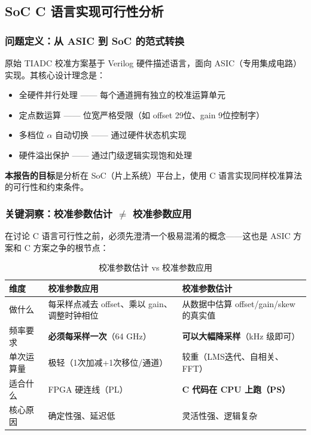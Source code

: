 \documentclass[UTF8,a4paper,11pt]{ctexart}
\begin{document}
\subsection{SoC C 语言实现可行性分析}
\label{sec:soc_feasibility}

\subsubsection{问题定义：从 ASIC 到 SoC 的范式转换}

原始 TIADC 校准方案基于 Verilog 硬件描述语言，面向 ASIC（专用集成电路）实现。其核心设计理念是：
\begin{itemize}
    \item 全硬件并行处理 —— 每个通道拥有独立的校准运算单元
    \item 定点数运算 —— 位宽严格受限（如 offset 29位、gain 9位控制字）
    \item 多档位 $\alpha$ 自动切换 —— 通过硬件状态机实现
    \item 硬件溢出保护 —— 通过门级逻辑实现饱和处理
\end{itemize}

\textbf{本报告的目标}是分析在 SoC（片上系统）平台上，使用 C 语言实现同样校准算法的可行性和约束条件。

\subsubsection{关键洞察：校准参数估计 $\neq$ 校准参数应用}

在讨论 C 语言可行性之前，必须先澄清一个极易混淆的概念——这也是 ASIC 方案和 C 方案之争的根节点：

\begin{table}[ht]
\centering
\caption{校准参数估计 vs 校准参数应用}
\begin{tabular}{p{2.8cm}p{4.5cm}p{4.5cm}}
\toprule
\textbf{维度} & \textbf{校准参数应用} & \textbf{校准参数估计} \\
\midrule
做什么 & 每采样点减去 offset、乘以 gain、调整时钟相位 & 从数据中估算 offset/gain/skew 的真实值 \\
频率要求 & \textbf{必须每采样一次}（64 GHz） & \textbf{可以大幅降采样}（kHz 级即可） \\
单次运算量 & 极轻（1次加减+1次移位/通道） & 较重（LMS迭代、自相关、FFT） \\
适合什么 & FPGA 硬连线（PL） & \textbf{C 代码在 CPU 上跑（PS）} \\
核心原因 & 确定性强、延迟低 & 灵活性强、逻辑复杂 \\
\bottomrule
\end{tabular}
\end{table}
\end{document}
